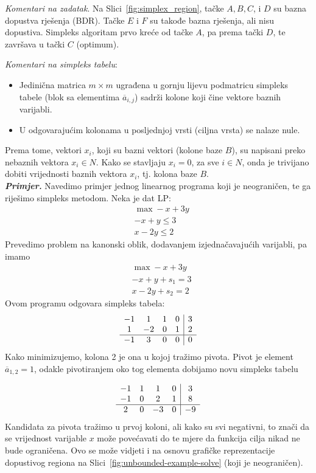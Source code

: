 \documentclass[a4paper, utf8, 11pt, colorlinks]{book}
\begin{document}
 \emph{Komentari na zadatak}. Na Slici~\ref{fig:simplex_region}, tačke $A, B, C$, i $D$ su bazna dopustva rješenja (BDR). Tačke $E$ i $F$ su takođe bazna rješenja, ali nisu dopustiva. Simpleks algoritam prvo kreće od tačke $A$, pa prema tački $D$, te završava u tački $C$ (optimum).
 
 \emph{Komentari na simpleks tabelu}:
 \begin{itemize}
     \item Jedinična matrica $m \times m$   ugrađena u gornju lijevu podmatricu simpleks tabele (blok sa elementima $\overline{a}_{i,j}$) sadrži kolone koji čine vektore baznih varijabli.
     \item U odgovarajućim kolonama u posljednjoj vrsti (ciljna vrsta) se nalaze nule.
 \end{itemize}
 Prema tome, vektori $x_i$, koji su bazni vektori (kolone baze $B$), su napisani preko nebaznih vektora $x_i \in N$. Kako se stavljaju $x_i  = 0$, za sve $i \in N$, onda je trivijano dobiti vrijednosti baznih vektora $x_i$, tj. kolona baze $B$. 
 \vspace{1cm}\\
 \emph{\textbf{Primjer.}} Navedimo primjer jednog linearnog programa koji je neograničen, te ga riješimo simpleks metodom. 
  Neka je dat LP:
  \begin{align*}
  	  &\max -x + 3y \\
  	  & -x + y \leq 3 \\
  	  & x - 2y \leq 2 
  \end{align*}
 Prevedimo problem na kanonski oblik, dodavanjem izjednačavajućih varijabli, pa imamo 
 \begin{align*}
      &\max -x + 3y \\
     & -x + y + s_1 = 3 \\
     & x - 2y + s_2 = 2  
 \end{align*}
Ovom programu odgovara simpleks tabela:
$$\begin{array}{cccc| c} 
	   -1 & 1  & 1 & 0 & 3 \\
	    1 & -2 & 0 & 1 & 2 \\ \hline
	   -1 & 3  & 0 & 0 & 0  
\end{array}$$
Kako minimizujemo,  kolona 2 je ona u kojoj tražimo pivota. Pivot je element 
$\overline{a}_{1, 2} = 1$, odakle pivotiranjem oko tog elementa dobijamo novu simpleks tabelu 

$$\begin{array}{cccc| c} 
		   -1 & 1  & 1  &  0 & 3 \\
		   -1 & 0  & 2  &  1 & 8 \\ \hline
		   2  & 0  & -3 &  0 & -9 \\
\end{array}$$
Kandidata za pivota tražimo u prvoj koloni, ali kako su svi negativni, to znači da se 
vrijednost  varijable $x$  može povećavati do te mjere da funkcija cilja nikad ne bude ograničena. 
Ovo se može vidjeti i na osnovu grafičke reprezentacije dopustivog regiona na Slici~\ref{fig:unbounded-example-solve} (koji je neograničen). 
\end{document}
